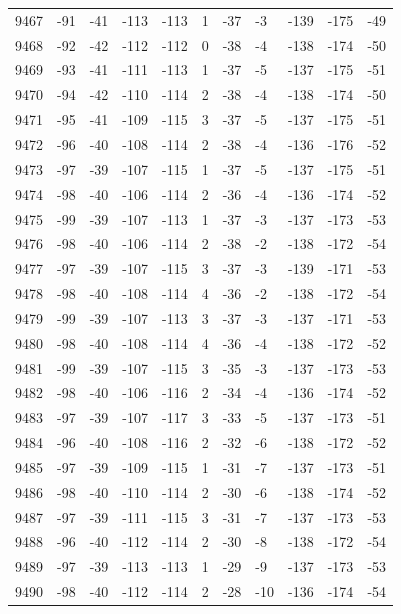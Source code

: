 \begin{table}[H]
\begin{tabular}{lllllllllll}
9467 & -91 & -41 & -113 & -113 & 1 & -37 & -3 & -139 & -175 & -49 \\
9468 & -92 & -42 & -112 & -112 & 0 & -38 & -4 & -138 & -174 & -50 \\
9469 & -93 & -41 & -111 & -113 & 1 & -37 & -5 & -137 & -175 & -51 \\
9470 & -94 & -42 & -110 & -114 & 2 & -38 & -4 & -138 & -174 & -50 \\
9471 & -95 & -41 & -109 & -115 & 3 & -37 & -5 & -137 & -175 & -51 \\
9472 & -96 & -40 & -108 & -114 & 2 & -38 & -4 & -136 & -176 & -52 \\
9473 & -97 & -39 & -107 & -115 & 1 & -37 & -5 & -137 & -175 & -51 \\
9474 & -98 & -40 & -106 & -114 & 2 & -36 & -4 & -136 & -174 & -52 \\
9475 & -99 & -39 & -107 & -113 & 1 & -37 & -3 & -137 & -173 & -53 \\
9476 & -98 & -40 & -106 & -114 & 2 & -38 & -2 & -138 & -172 & -54 \\
9477 & -97 & -39 & -107 & -115 & 3 & -37 & -3 & -139 & -171 & -53 \\
9478 & -98 & -40 & -108 & -114 & 4 & -36 & -2 & -138 & -172 & -54 \\
9479 & -99 & -39 & -107 & -113 & 3 & -37 & -3 & -137 & -171 & -53 \\
9480 & -98 & -40 & -108 & -114 & 4 & -36 & -4 & -138 & -172 & -52 \\
9481 & -99 & -39 & -107 & -115 & 3 & -35 & -3 & -137 & -173 & -53 \\
9482 & -98 & -40 & -106 & -116 & 2 & -34 & -4 & -136 & -174 & -52 \\
9483 & -97 & -39 & -107 & -117 & 3 & -33 & -5 & -137 & -173 & -51 \\
9484 & -96 & -40 & -108 & -116 & 2 & -32 & -6 & -138 & -172 & -52 \\
9485 & -97 & -39 & -109 & -115 & 1 & -31 & -7 & -137 & -173 & -51 \\
9486 & -98 & -40 & -110 & -114 & 2 & -30 & -6 & -138 & -174 & -52 \\
9487 & -97 & -39 & -111 & -115 & 3 & -31 & -7 & -137 & -173 & -53 \\
9488 & -96 & -40 & -112 & -114 & 2 & -30 & -8 & -138 & -172 & -54 \\
9489 & -97 & -39 & -113 & -113 & 1 & -29 & -9 & -137 & -173 & -53 \\
9490 & -98 & -40 & -112 & -114 & 2 & -28 & -10 & -136 & -174 & -54 \\

\end{tabular}
\end{table}
